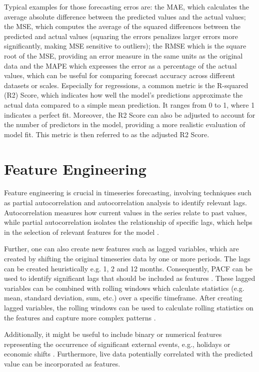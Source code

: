Typical examples for those forecasting erros are: the \ac{MAE}, which calculates the average absolute difference between the predicted values and the actual values; the \ac{MSE}, which computes the average of the squared differences between the predicted and actual values (squaring the errors penalizes larger errors more significantly, making MSE sensitive to outliers); the \ac{RMSE} which is the square root of the \ac{MSE}, providing an error measure in the same units as the original data and the \ac{MAPE} which expresses the error as a percentage of the actual values, which can be useful for comparing forecast accuracy across different datasets or scales. Especially for regressions, a common metric is the R-squared (R2) Score, which indicates how well the model's predictions approximate the actual data compared to a simple mean prediction. It ranges from 0 to 1, where 1 indicates a perfect fit. Moreover, the R2 Score can also be adjusted to account for the number of predictors in the model, providing a more realistic evaluation of model fit. This metric is then referred to as the adjusted R2 Score.

\section{Feature Engineering}
Feature engineering is crucial in timeseries forecasting, involving techniques such as partial autocorrelation and autocorrelation analysis to identify relevant lags. Autocorrelation measures how current values in the series relate to past values, while partial autocorrelation isolates the relationship of specific lags, which helps in the selection of relevant features for the model \parencite{box2015time}. 

Further, one can also create new features such as lagged variables, which are created by shifting the original timeseries data by one or more periods. The lags can be created heuristically e.g. 1, 2 and 12 months. Consequently, \ac{PACF} can be used to identify significant lags that should be included as features \parencite[ch. 6]{hyndman2018forecasting}. These lagged variables can be combined with rolling windows which calculate statistics (e.g. mean, standard deviation, sum, etc.) over a specific timeframe. After creating lagged variables, the rolling windows can be used to calculate rolling statistics on the features and capture more complex patterns \parencite[ch. 6]{hyndman2018forecasting}. 

Additionally, it might be useful to include binary or numerical features representing the occurrence of significant external events, e.g., holidays or economic shifts \parencite[ch. 3]{hyndman2018forecasting}. Furthermore, live data potentially correlated with the predicted value can be incorporated as features. 

